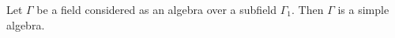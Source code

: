 Let $\Gamma$ be a field considered as an algebra over a subfield $\Gamma_1$. Then $\Gamma$ is a simple algebra.
